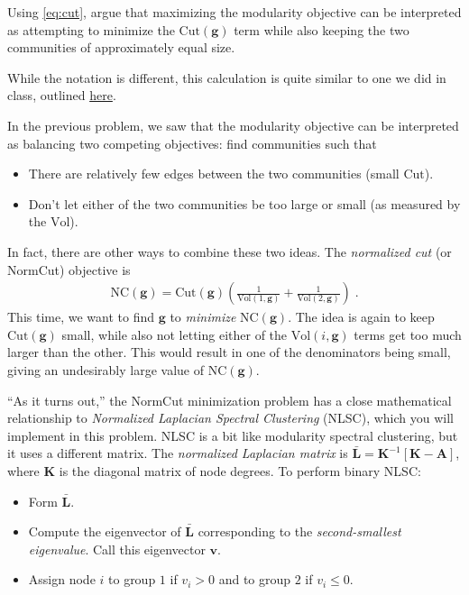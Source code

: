 \documentclass{hw}
\begin{document}
Using \eqref{eq:cut}, argue that maximizing the modularity objective can be interpreted as attempting to minimize the $\mathrm{Cut}(\mathbf{g})$ term while also keeping the two communities of approximately equal size. 

\begin{hint}
    While the notation is different, this calculation is quite similar to one we did in class, outlined \href{https://www.philchodrow.com/intro-networks/chapters/clustering_community.html#another-perspective-on-modularity}{here}.
\end{hint}


\problem{} 

In the previous problem, we saw that the modularity objective can be interpreted as balancing two competing objectives: find communities such that
\begin{itemize}
    \item There are relatively few edges between the two communities (small $\mathrm{Cut}$). 
    \item Don't let either of the two communities be too large or small (as measured by the $\mathrm{Vol}$). 
\end{itemize}
In fact, there are other ways to combine these two ideas. 
The \emph{normalized cut} (or NormCut) objective is 
\begin{align}
    \mathrm{NC}(\mathbf{g}) = \mathrm{Cut}(\mathbf{g})\left(\frac{1}{\mathrm{Vol}(1,\mathbf{g})} + \frac{1}{\mathrm{Vol}(2,\mathbf{g})}\right)\;. 
\end{align}
This time, we want to find $\mathbf{g}$ to \emph{minimize} $\mathrm{NC}(\mathbf{g})$. 
The idea is again to keep $\mathrm{Cut}(\mathbf{g})$ small, while also not letting either of the $\mathrm{Vol}(i,\mathbf{g})$ terms get too much larger than the other. This would result in one of the denominators being small, giving an undesirably large value of $\mathrm{NC}(\mathbf{g})$. 

``As it turns out,'' the NormCut minimization problem has a close mathematical relationship to \emph{Normalized Laplacian Spectral Clustering} (NLSC), which you will implement in this problem. 
NLSC is a bit like modularity spectral clustering, but it uses a different matrix. 
The \emph{normalized Laplacian matrix} is $\bar{\mathbf{L}} = \mathbf{K}^{-1}\left[\mathbf{K} - \mathbf{A}\right]$, where $\mathbf{K}$ is the diagonal matrix of node degrees. 
To perform binary NLSC: 
\begin{itemize}
    \item Form $\bar{\mathbf{L}}$. 
    \item Compute the eigenvector of $\bar{\mathbf{L}}$ corresponding to the \emph{second-smallest eigenvalue}. 
    Call this eigenvector $\mathbf{v}$. 
    \item Assign node $i$ to group $1$ if $v_i > 0$ and to group $2$ if $v_i \leq 0$.  
\end{itemize}
\end{document}
